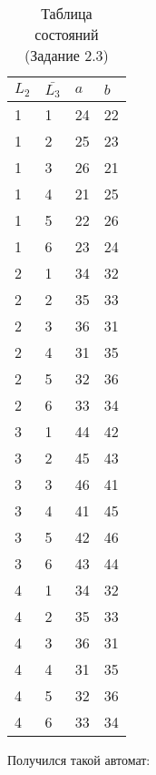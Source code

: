 \documentclass[a4paper]{article}
\begin{document}
\begin{table}[!htbp]
\centering
\begin{tabular}{|l|l|l|l|}
\hline
$L_{2}$ & $\bar{L_{3}}$ & $a$ & $b$ \\ \hline
1       & 1             & 24  & 22  \\ \hline
1       & 2             & 25  & 23  \\ \hline
1       & 3             & 26  & 21  \\ \hline
1       & 4             & 21  & 25  \\ \hline
1       & 5             & 22  & 26  \\ \hline
1       & 6             & 23  & 24  \\ \hline
2       & 1             & 34  & 32  \\ \hline
2       & 2             & 35  & 33  \\ \hline
2       & 3             & 36  & 31  \\ \hline
2       & 4             & 31  & 35  \\ \hline
2       & 5             & 32  & 36  \\ \hline
2       & 6             & 33  & 34  \\ \hline
3       & 1             & 44  & 42  \\ \hline
3       & 2             & 45  & 43  \\ \hline
3       & 3             & 46  & 41  \\ \hline
3       & 4             & 41  & 45  \\ \hline
3       & 5             & 42  & 46  \\ \hline
3       & 6             & 43  & 44  \\ \hline
4       & 1             & 34  & 32  \\ \hline
4       & 2             & 35  & 33  \\ \hline
4       & 3             & 36  & 31  \\ \hline
4       & 4             & 31  & 35  \\ \hline
4       & 5             & 32  & 36  \\ \hline
4       & 6             & 33  & 34  \\ \hline
\end{tabular}
\caption{Таблица состояний (Задание 2.3)}
\end{table}



Получился такой автомат:
\end{document}
